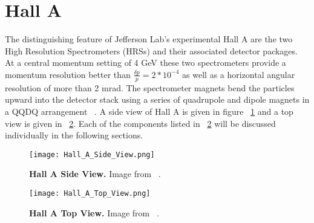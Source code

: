 \section{Hall A}
\label{sec:HallA}

The distinguishing feature of Jefferson Lab's experimental Hall A are the two High Resolution Spectrometers (HRSs) and their associated detector packages. At a central momentum setting of 4 GeV these two spectrometers provide a momentum resolution better than $\frac{\delta p}{p} = 2*10^{-4}$ as well as a horizontal angular resolution of more than 2 mrad. The spectrometer magnets bend the particles upward into the detector stack using a series of quadrupole and dipole magnets in a QQDQ arrangement ~\cite{Article:HallA}. A side view of Hall A is given in figure ~\ref{fig:halla_side} and a top view is given in ~\ref{fig:halla_top}. Each of the components listed in ~\ref{fig:halla_top} will be discussed individually in the following sections.

\begin{figure}[!ht]
\begin{center}
\texttt{[image: Hall\_A\_Side\_View.png]}
\end{center}
\caption{
{\bf{Hall A Side View.}} Image from ~\cite{Article:HallA}.}
\label{fig:halla_side}
\end{figure}

\begin{figure}[!ht]
\begin{center}
\texttt{[image: Hall\_A\_Top\_View.png]}
\end{center}
\caption{
{\bf{Hall A Top View.}} Image from ~\cite{Thesis:Wang}.}
\label{fig:halla_top}
\end{figure}